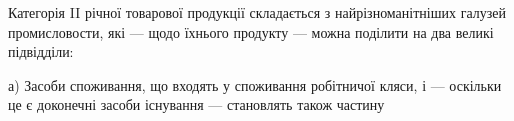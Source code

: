 Категорія II річної товарової продукції складається з найрізноманітніших
галузей промисловости, які — щодо їхнього продукту — можна поділити
на два великі підвідділи:

а) Засоби споживання, що входять у споживання робітничої кляси, і —
оскільки це є доконечні засоби існування — становлять також частину
\parbreak{}  %
